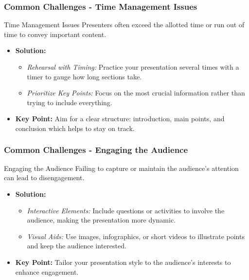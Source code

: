 \documentclass[aspectratio=169]{beamer}
\begin{document}
\begin{frame}[fragile]
  \frametitle{Common Challenges - Time Management Issues}
  \begin{block}{Time Management Issues}
    Presenters often exceed the allotted time or run out of time to convey important content.
  \end{block}
  \begin{itemize}
    \item \textbf{Solution:}
    \begin{itemize}
      \item \textit{Rehearsal with Timing:} Practice your presentation several times with a timer to gauge how long sections take.
      \item \textit{Prioritize Key Points:} Focus on the most crucial information rather than trying to include everything.
    \end{itemize}
    \item \textbf{Key Point:} Aim for a clear structure: introduction, main points, and conclusion which helps to stay on track.
  \end{itemize}
\end{frame}

\begin{frame}[fragile]
  \frametitle{Common Challenges - Engaging the Audience}
  \begin{block}{Engaging the Audience}
    Failing to capture or maintain the audience's attention can lead to disengagement.
  \end{block}
  \begin{itemize}
    \item \textbf{Solution:}
    \begin{itemize}
      \item \textit{Interactive Elements:} Include questions or activities to involve the audience, making the presentation more dynamic.
      \item \textit{Visual Aids:} Use images, infographics, or short videos to illustrate points and keep the audience interested.
    \end{itemize}
    \item \textbf{Key Point:} Tailor your presentation style to the audience’s interests to enhance engagement.
  \end{itemize}
\end{frame}
\end{document}

